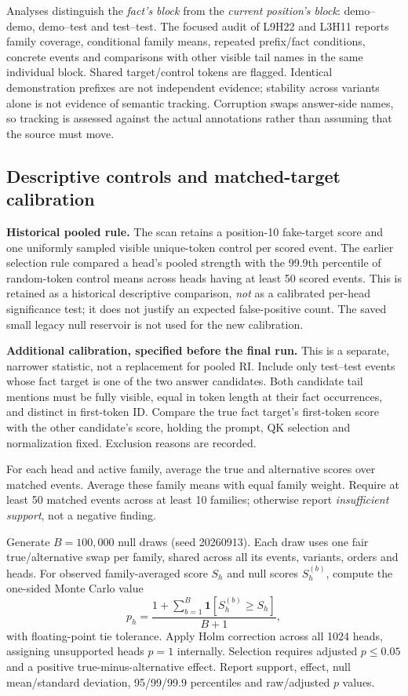 Analyses distinguish the \emph{fact's block} from the \emph{current position's block}: demo--demo, demo--test and test--test. The focused audit of L9H22 and L3H11 reports family coverage, conditional family means, repeated prefix/fact conditions, concrete events and comparisons with other visible tail names in the same individual block. Shared target/control tokens are flagged. Identical demonstration prefixes are not independent evidence; stability across variants alone is not evidence of semantic tracking. Corruption swaps answer-side names, so tracking is assessed against the actual annotations rather than assuming that the source must move.

\subsection{Descriptive controls and matched-target calibration}
\textbf{Historical pooled rule.} The scan retains a position-10 fake-target score and one uniformly sampled visible unique-token control per scored event. The earlier selection rule compared a head's pooled strength with the 99.9th percentile of random-token control means across heads having at least 50 scored events. This is retained as a historical descriptive comparison, \emph{not} as a calibrated per-head significance test; it does not justify an expected false-positive count. The saved small legacy null reservoir is not used for the new calibration.

\textbf{Additional calibration, specified before the final run.} This is a separate, narrower statistic, not a replacement for pooled RI. Include only test--test events whose fact target is one of the two answer candidates. Both candidate tail mentions must be fully visible, equal in token length at their fact occurrences, and distinct in first-token ID. Compare the true fact target's first-token score with the other candidate's score, holding the prompt, QK selection and normalization fixed. Exclusion reasons are recorded.

For each head and active family, average the true and alternative scores over matched events. Average these family means with equal family weight. Require at least 50 matched events across at least 10 families; otherwise report \emph{insufficient support}, not a negative finding.

Generate $B=100{,}000$ null draws (seed 20260913). Each draw uses one fair true/alternative swap per family, shared across all its events, variants, orders and heads. For observed family-averaged score $S_h$ and null scores $S_h^{(b)}$, compute the one-sided Monte Carlo value
\begin{equation}
p_h=\frac{1+\sum_{b=1}^{B}\mathbf{1}[S_h^{(b)}\ge S_h]}{B+1},
\end{equation}
with floating-point tie tolerance. Apply Holm correction across all 1024 heads, assigning unsupported heads $p=1$ internally. Selection requires adjusted $p\le0.05$ and a positive true-minus-alternative effect. Report support, effect, null mean/standard deviation, 95/99/99.9 percentiles and raw/adjusted $p$ values.

